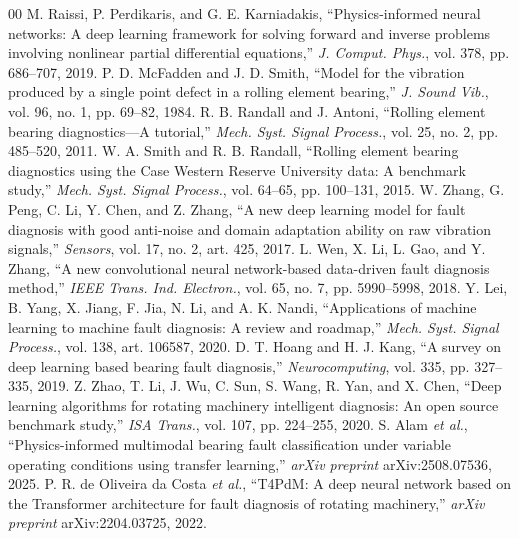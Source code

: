 \documentclass[conference]{IEEEtran}
\begin{document}
\clearpage
\begin{thebibliography}{00}
 M. Raissi, P. Perdikaris, and G. E. Karniadakis,
``Physics-informed neural networks: A deep learning framework for solving
forward and inverse problems involving nonlinear partial differential
equations,'' \textit{J. Comput. Phys.}, vol. 378, pp. 686--707, 2019.
 P. D. McFadden and J. D. Smith, ``Model for the vibration
produced by a single point defect in a rolling element bearing,'' \textit{J.
Sound Vib.}, vol. 96, no. 1, pp. 69--82, 1984.
 R. B. Randall and J. Antoni, ``Rolling element bearing
diagnostics---A tutorial,'' \textit{Mech. Syst. Signal Process.}, vol. 25, no.
2, pp. 485--520, 2011.
 W. A. Smith and R. B. Randall, ``Rolling element bearing
diagnostics using the Case Western Reserve University data: A benchmark study,''
\textit{Mech. Syst. Signal Process.}, vol. 64--65, pp. 100--131, 2015.
 W. Zhang, G. Peng, C. Li, Y. Chen, and Z. Zhang, ``A new
deep learning model for fault diagnosis with good anti-noise and domain
adaptation ability on raw vibration signals,'' \textit{Sensors}, vol. 17, no. 2,
art. 425, 2017.
 L. Wen, X. Li, L. Gao, and Y. Zhang, ``A new convolutional
neural network-based data-driven fault diagnosis method,'' \textit{IEEE Trans.
Ind. Electron.}, vol. 65, no. 7, pp. 5990--5998, 2018.
 Y. Lei, B. Yang, X. Jiang, F. Jia, N. Li, and A. K. Nandi,
``Applications of machine learning to machine fault diagnosis: A review and
roadmap,'' \textit{Mech. Syst. Signal Process.}, vol. 138, art. 106587, 2020.
 D. T. Hoang and H. J. Kang, ``A survey on deep learning based
bearing fault diagnosis,'' \textit{Neurocomputing}, vol. 335, pp. 327--335,
2019.
 Z. Zhao, T. Li, J. Wu, C. Sun, S. Wang, R. Yan, and X. Chen,
``Deep learning algorithms for rotating machinery intelligent diagnosis: An
open source benchmark study,'' \textit{ISA Trans.}, vol. 107, pp. 224--255, 2020.
 S. Alam \textit{et al.}, ``Physics-informed multimodal bearing
fault classification under variable operating conditions using transfer
learning,'' \textit{arXiv preprint} arXiv:2508.07536, 2025.
 P. R. de Oliveira da Costa \textit{et al.}, ``T4PdM: A deep
neural network based on the Transformer architecture for fault diagnosis of
rotating machinery,'' \textit{arXiv preprint} arXiv:2204.03725, 2022.

\end{thebibliography}
\end{document}
